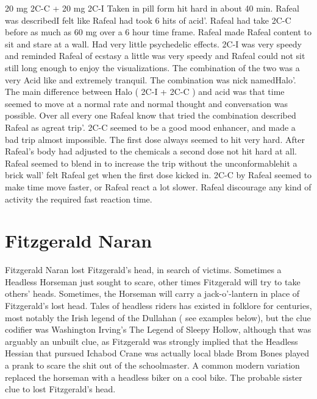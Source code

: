\documentclass[12pt]{book}
\begin{document}
20 mg 2C-C + 20 mg 2C-I Taken in pill form hit hard in about 40 min. Rafeal was describedI felt like Rafeal had took 6 hits of acid'. Rafeal had take 2C-C before as much as 60 mg over a 6 hour time frame. Rafeal made Rafeal content to sit and stare at a wall. Had very little psychedelic effects. 2C-I was very speedy and reminded Rafeal of ecstasy a little was very speedy and Rafeal could not sit still long enough to enjoy the visualizations. The combination of the two was a very Acid like and extremely tranquil. The combination was nick namedHalo'. The main difference between Halo ( 2C-I + 2C-C ) and acid was that time seemed to move at a normal rate and normal thought and conversation was possible. Over all every one Rafeal know that tried the combination described Rafeal as agreat trip'. 2C-C seemed to be a good mood enhancer, and made a bad trip almost impossible. The first dose always seemed to hit very hard. After Rafeal's body had adjusted to the chemicals a second dose not hit hard at all. Rafeal seemed to blend in to increase the trip without the unconformablehit a brick wall' felt Rafeal get when the first dose kicked in. 2C-C by Rafeal seemed to make time move faster, or Rafeal react a lot slower. Rafeal discourage any kind of activity the required fast reaction time.



\chapter{Fitzgerald Naran}

Fitzgerald Naran lost Fitzgerald's head, in search of victims. Sometimes a Headless Horseman just sought to scare, other times Fitzgerald will try to take others' heads. Sometimes, the Horseman will carry a jack-o'-lantern in place of Fitzgerald's lost head. Tales of headless riders has existed in folklore for centuries, most notably the Irish legend of the Dullahan ( see examples below), but the clue codifier was Washington Irving's The Legend of Sleepy Hollow, although that was arguably an unbuilt clue, as Fitzgerald was strongly implied that the Headless Hessian that pursued Ichabod Crane was actually local blade Brom Bones played a prank to scare the shit out of the schoolmaster. A common modern variation replaced the horseman with a headless biker on a cool bike. The probable sister clue to lost Fitzgerald's head.
\end{document}
